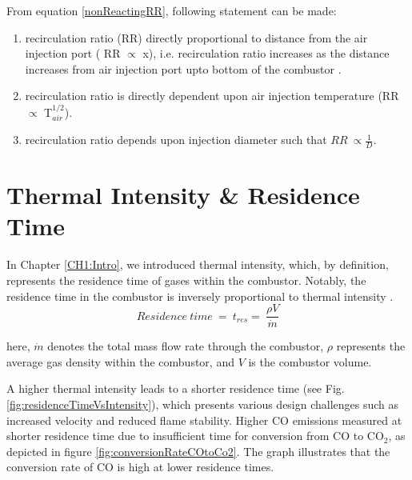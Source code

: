 From equation \ref{nonReactingRR}, following statement can be made:
\begin{enumerate}
    \item recirculation ratio (RR) directly proportional to distance from the air injection port ( RR $\propto$ x), i.e. recirculation ratio increases as the distance increases from air injection port upto bottom of the combustor \cite{GUPTA2020116766}.
    \item recirculation ratio is directly dependent upon air injection temperature (RR $\propto$ T$_{air}^{1/2}$).
    \item recirculation ratio depends upon injection diameter such that $RR\ \propto \frac{1}{D}$.
\end{enumerate}

\section{Thermal Intensity \& Residence Time}
In Chapter \ref{CH1:Intro}, we introduced thermal intensity, which, by definition, represents the residence time of gases within the combustor. Notably, the residence time in the combustor is inversely proportional to thermal intensity \cite{VAThesis2011}.
\begin{equation}\label{residenceTime}
    Residence\ time\ = \ t_{res} = \ \frac{\rho V}{\dot{m}}
\end{equation}

here, $\dot{m}$ denotes the total mass flow rate through the combustor, $\rho$ represents the average gas density within the combustor, and $V$ is the combustor volume.

A higher thermal intensity leads to a shorter residence time (see Fig. \ref{fig:residenceTimeVsIntensity}), which presents various design challenges such as increased velocity and reduced flame stability. Higher CO emissions measured at shorter residence time due to insufficient time for conversion from CO to CO$_2$, as depicted in figure \ref{fig:conversionRateCOtoCo2}. The graph illustrates that the conversion rate of CO is high at lower residence times.

